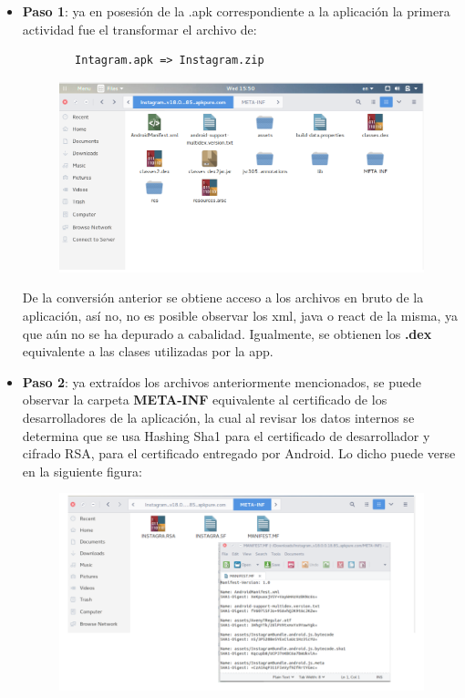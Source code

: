 \documentclass[a4paper,11pt]{article}
\theoremstyle{mytheor}
\begin{document}
\begin{itemize}
    \item \textbf{Paso 1}: ya en posesión de la .apk correspondiente a la aplicación la primera actividad fue el transformar el archivo de:
    
    \begin{verbatim}
        Intagram.apk => Instagram.zip
    \end{verbatim}
    
    \begin{figure}[!h]
    \centering
    \includegraphics[scale=0.5]{decompiladaapk.png}
    \label{fig:my_label}
    \end{figure}
    
    De la conversión anterior se obtiene acceso a los archivos en bruto de la aplicación, así no, no es posible observar los xml, java o react de la misma, ya que aún no se ha depurado a cabalidad. Igualmente, se obtienen los \textbf{.dex} equivalente a las clases utilizadas por la app. 
        
    
    \item \textbf{Paso 2}: ya extraídos los archivos anteriormente mencionados, se puede observar la carpeta \textbf{META-INF} equivalente al certificado de los desarrolladores de la aplicación, la cual al revisar los datos internos se determina que  se usa Hashing Sha1 para el certificado de desarrollador y cifrado RSA, para el certificado entregado por Android. Lo dicho puede verse en la siguiente figura:
    
     \begin{figure}[!h]
    \centering
    \includegraphics[scale=0.5]{meta-inf2.png}
    \label{fig:my_label}
    \end{figure}
    

\end{itemize}
\end{document}
